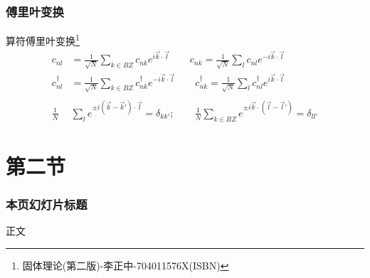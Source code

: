 \documentclass{beamer}
\begin{document}
    \begin{frame}
    	\frametitle{傅里叶变换}
    	算符傅里叶变换\footnote{\noindent\tiny{固体理论(第二版)-李正中-704011576X(ISBN)}}  %
    	$$
    	\begin{aligned}
    	c_{nl}&=\frac{1}{\sqrt{N}}\sum_{k\in BZ}c_{nk}e^{i\vec{k}\cdot\vec{l}} \qquad c_{nk}=\frac{1}{\sqrt{N}}\sum_{l}c_{nl}e^{-i\vec{k}\cdot \vec{l}}  \\
    	c_{nl}^{\dagger}&=\frac{1}{\sqrt{N}}\sum_{k\in BZ}c_{nk}^{\dagger}e^{-i\vec{k}\cdot\vec{l}} \qquad c_{nk}^{\dagger}=\frac{1}{\sqrt{N}}\sum_{l}c_{nl}^{\dagger}e^{i\vec{k}\cdot \vec{l}} \\
    	~\\
    	\frac{1}{N}&\sum_{l}e^{\pm i(\vec{k}-\vec{k}')\cdot \vec{l}} = \delta_{kk'}; \qquad \frac{1}{N}\sum_{k\in BZ}e^{\pm i\vec{k}\cdot (\vec{l}-\vec{l}')}=\delta_{ll'}
    	\end{aligned}
    	$$
    \end{frame}

    \section{第二节}
	\begin{frame}
		\frametitle{本页幻灯片标题}
		正文
	\end{frame}
    
\end{document}
